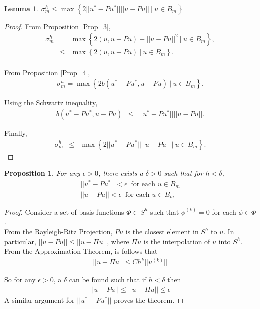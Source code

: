 \documentclass[../../main.tex]{subfiles}
\begin{document}
\newtheorem{Lem_2}[Lem_1]{Lemma} \label{Lem_2}
\begin{Lem_2}
	$\sigma_{m}^{h} \leq \max \left\{2||u^{*}- Pu^{*}|| ||u-Pu|| \ | \ u \in B_{m} \right\}$
\end{Lem_2}
\begin{proof}
	From Proposition \ref{Prop_3},
	\begin{eqnarray*}
		\sigma_{m}^{h} & = & \max\left\{ 2( u,u-Pu )-||u-Pu||^{2} \ | \ u \in B_{m} \right\}, \\
					& \leq & \max\left\{ 2( u,u-Pu ) \ | \ u \in B_{m} \right\}. \\
	\end{eqnarray*}

	From Proposition \ref{Prop_4}, 
	\begin{eqnarray*}
		\sigma_{m}^{h} = \max\left\{ 2 b(u^{*}-Pu^{*}, u-Pu) \ | \ u \in B_{m} \right\}.
	\end{eqnarray*}

	Using the Schwartz inequality,
	\begin{eqnarray*}
		b(u^{*} - Pu^{*}, u -Pu) & \leq & ||u^{*} - Pu^{*}||||u -Pu||.
	\end{eqnarray*}

	Finally,
	\begin{eqnarray*}
		\sigma_{m}^{h} & \leq & \max\left\{ 2||u^{*}- Pu^{*}|| ||u-Pu|| \ | \ u \in B_{m} \right\}.
	\end{eqnarray*}
\end{proof}

\newtheorem{Prop_5}[Prop_1]{Proposition} \label{Prop_5}
\begin{Prop_5}
	For any $\epsilon > 0$, there exists a $\delta >0$ such that for $h<\delta$,
	\begin{eqnarray*}
	||u^{*} - Pu^{*}|| < \epsilon \ \textrm{ for each } u \in B_{m}\\
	||u - Pu|| < \epsilon \ \textrm{ for each } u \in B_{m}
	\end{eqnarray*}
\end{Prop_5}
\begin{proof}
	Consider a set of basis functions $\Phi \subset S^h$ such that $\phi^(k) = 0$ for each $\phi \in \Phi$.\\ 

	From the Rayleigh-Ritz Projection, $Pu$ is the closest element in $S^h$ to $u$. In particular, $||u-Pu||\leq ||u-\Pi u||$, where $\Pi u$ is the interpolation of $u$ into $S^h$.\\
	
	From the Approximation Theorem, is follows that
	\begin{eqnarray*}
		||u - \Pi u|| \leq Ch^{k}||u^{(k)}||
	\end{eqnarray*}

	So for any $\epsilon > 0$, a $\delta$ can be found such that if $h<\delta$ then
	\begin{eqnarray*}
		||u - Pu|| \leq ||u - \Pi u|| \leq \epsilon
	\end{eqnarray*}
	A similar argument for $||u^{*} - Pu^{*}||$ proves the theorem.
\end{proof}
\end{document}
